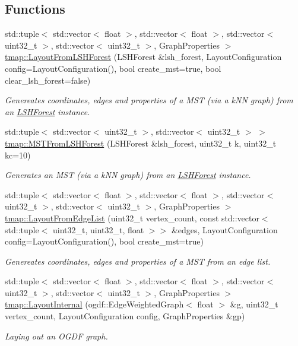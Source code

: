 \subsection*{Functions}
\begin{DoxyCompactItemize}
\item 
std\+::tuple$<$ std\+::vector$<$ float $>$, std\+::vector$<$ float $>$, std\+::vector$<$ uint32\+\_\+t $>$, std\+::vector$<$ uint32\+\_\+t $>$, Graph\+Properties $>$ \hyperlink{layout_8hh_a1b41a97f59e18234250f76085a7d437b}{tmap\+::\+Layout\+From\+L\+S\+H\+Forest} (L\+S\+H\+Forest \&lsh\+\_\+forest, Layout\+Configuration config=Layout\+Configuration(), bool create\+\_\+mst=true, bool clear\+\_\+lsh\+\_\+forest=false)
\begin{DoxyCompactList}\small\item\em Genereates coordinates, edges and properties of a M\+ST (via a k\+NN graph) from an \hyperlink{classtmap_1_1LSHForest}{L\+S\+H\+Forest} instance. \end{DoxyCompactList}\item 
std\+::tuple$<$ std\+::vector$<$ uint32\+\_\+t $>$, std\+::vector$<$ uint32\+\_\+t $>$ $>$ \hyperlink{layout_8hh_a033d33fa567d893125d956e56933335f}{tmap\+::\+M\+S\+T\+From\+L\+S\+H\+Forest} (L\+S\+H\+Forest \&lsh\+\_\+forest, uint32\+\_\+t k, uint32\+\_\+t kc=10)
\begin{DoxyCompactList}\small\item\em Generates an M\+ST (via a k\+NN graph) from an \hyperlink{classtmap_1_1LSHForest}{L\+S\+H\+Forest} instance. \end{DoxyCompactList}\item 
std\+::tuple$<$ std\+::vector$<$ float $>$, std\+::vector$<$ float $>$, std\+::vector$<$ uint32\+\_\+t $>$, std\+::vector$<$ uint32\+\_\+t $>$, Graph\+Properties $>$ \hyperlink{layout_8hh_a780993ad8dd7e349b77f55895cc33451}{tmap\+::\+Layout\+From\+Edge\+List} (uint32\+\_\+t vertex\+\_\+count, const std\+::vector$<$ std\+::tuple$<$ uint32\+\_\+t, uint32\+\_\+t, float $>$$>$ \&edges, Layout\+Configuration config=Layout\+Configuration(), bool create\+\_\+mst=true)
\begin{DoxyCompactList}\small\item\em Genereates coordinates, edges and properties of a M\+ST from an edge list. \end{DoxyCompactList}\item 
std\+::tuple$<$ std\+::vector$<$ float $>$, std\+::vector$<$ float $>$, std\+::vector$<$ uint32\+\_\+t $>$, std\+::vector$<$ uint32\+\_\+t $>$, Graph\+Properties $>$ \hyperlink{layout_8hh_a126dbc6ec8355732c528abb2877e60d4}{tmap\+::\+Layout\+Internal} (ogdf\+::\+Edge\+Weighted\+Graph$<$ float $>$ \&g, uint32\+\_\+t vertex\+\_\+count, Layout\+Configuration config, Graph\+Properties \&gp)
\begin{DoxyCompactList}\small\item\em Laying out an O\+G\+DF graph. \end{DoxyCompactList}\end{DoxyCompactItemize}


